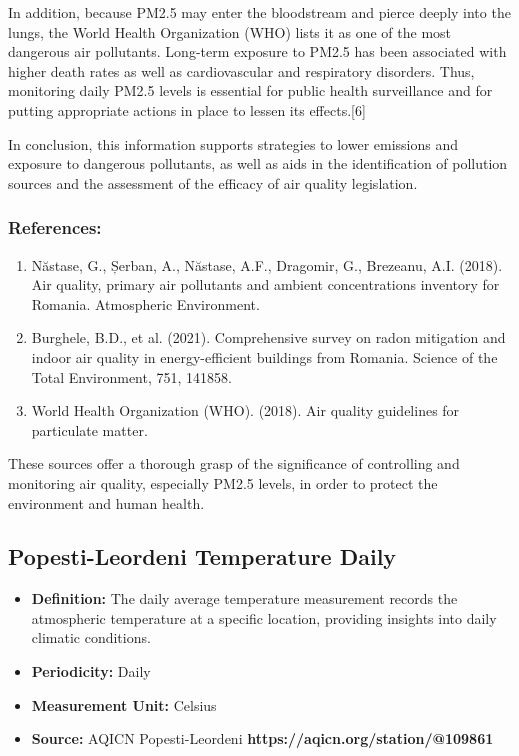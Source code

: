 \documentclass{article} %
\begin{document}
In addition, because PM2.5 may enter the bloodstream and pierce deeply into the lungs, the World Health Organization (WHO) lists it as one of the most dangerous air pollutants. Long-term exposure to PM2.5 has been associated with higher death rates as well as cardiovascular and respiratory disorders. Thus, monitoring daily PM2.5 levels is essential for public health surveillance and for putting appropriate actions in place to lessen its effects.[6]

In conclusion, this information supports strategies to lower emissions and exposure to dangerous pollutants, as well as aids in the identification of pollution sources and the assessment of the efficacy of air quality legislation.

\subsubsection*{References:}
\begin{enumerate}
    \item Năstase, G., Șerban, A., Năstase, A.F., Dragomir, G., Brezeanu, A.I. (2018). Air quality, primary air pollutants and ambient concentrations inventory for Romania. Atmospheric Environment.
    \item Burghele, B.D., et al. (2021). Comprehensive survey on radon mitigation and indoor air quality in energy-efficient buildings from Romania. Science of the Total Environment, 751, 141858.
    \item World Health Organization (WHO). (2018). Air quality guidelines for particulate matter.
\end{enumerate}
These sources offer a thorough grasp of the significance of controlling and monitoring air quality, especially PM2.5 levels, in order to protect the environment and human health.

\subsection{Popesti-Leordeni Temperature Daily}
\begin{itemize}
    \item \textbf{Definition:} The daily average temperature measurement records the atmospheric temperature at a specific location, providing insights into daily climatic conditions.
    \item \textbf{Periodicity:} Daily
    \item \textbf{Measurement Unit:} Celsius
    \item \textbf{Source:} AQICN Popesti-Leordeni \textbf{https://aqicn.org/station/@109861}
\end{itemize}
\end{document}
